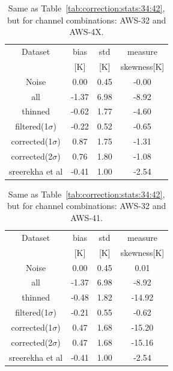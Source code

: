 \documentclass[12pt]{article}
\begin{document}
\begin{table}[!bt]
	\centering
	\begin{tabular}[b]{c|c|c|c}
		Dataset  		  &   bias &   std &   measure  \\
		&   [K]  &   [K] & skewness[K]\\
		\hline
	Noise             &   0.00 &  0.45 &              -0.00 \\
	all               &  -1.37 &  6.98 &              -8.92 \\
	thinned           &  -0.62 &  1.77 &              -4.60 \\
	filtered(1$\sigma$)   &  -0.22 &  0.52 &              -0.65 \\
	corrected(1$\sigma$) &   0.87 &  1.75 &              -1.31 \\
	corrected(2$\sigma$) &   0.76 &  1.80 &              -1.08 \\
	sreerekha et al   &  -0.41 &  1.00 &              -2.54 \\
		\hline
	\end{tabular}
	\caption{Same as Table~\ref{tab:correction:stats:34:42}, but for channel combinations: AWS-32 and AWS-4X.   }
	\label{tab:correction:stats:32:4X}
\end{table}

\begin{table}[!bt]
	\centering
	\begin{tabular}[b]{c|c|c|c}
		Dataset  		  &   bias &   std &   measure  \\
		&   [K]  &   [K] & skewness[K]\\
		\hline
Noise             &   0.00 &  0.45 &               0.01 \\
all               &  -1.37 &  6.98 &              -8.92 \\
thinned           &  -0.48 &  1.82 &             -14.92 \\
filtered(1$\sigma$)   &  -0.21 &  0.55 &              -0.62 \\	
corrected(1$\sigma$) &   0.47 &  1.68 &             -15.20 \\
corrected(2$\sigma$) &   0.47 &  1.68 &             -15.16 \\
sreerekha et al   &  -0.41 &  1.00 &              -2.54 \\		
		\hline
	\end{tabular}
	\caption{Same as Table~\ref{tab:correction:stats:34:42}, but for channel combinations: AWS-32 and AWS-41.   }
	\label{tab:correction:stats:32:41}
\end{table}
\end{document}
